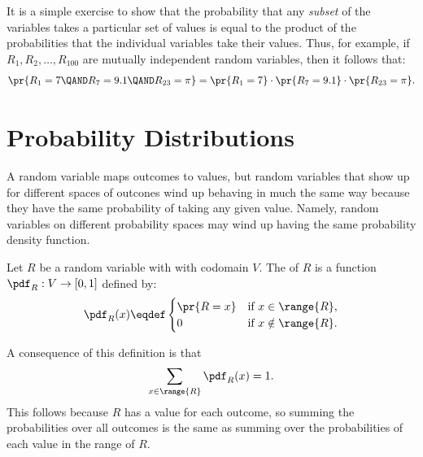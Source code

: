 It is a simple exercise to show that the probability that any
\emph{subset} of the variables takes a particular set of values is equal
to the product of the probabilities that the individual variables take
their values.  Thus, for example, if $R_1, R_2, \dots, R_{100}$ are
mutually independent random variables, then it follows that:
\[
\pr{R_1 = 7 \QAND R_7 = 9.1 \QAND R_{23} = \pi} = \pr{R_1 = 7} \cdot
\pr{R_7 = 9.1} \cdot \pr{R_{23} = \pi}.
\]



\section{Probability Distributions}

A random variable maps outcomes to values, but random variables that show
up for different spaces of outcones wind up behaving in much the same way
because they have the same probability of taking any given value.  Namely,
random variables on different probability spaces may wind up having the
same probability density function.

\begin{definition}
Let $R$ be a random variable with with codomain $V$.
The  of $R$
is a function $\pdf_R : V \to [0,1]$ defined by:
%
\[
\pdf_R(x) \eqdef \begin{cases}
            \pr{R = x} & \text{if } x \in \range{R},\\
             0 & \text{if } x \notin \range{R}.
           \end{cases}
\]
\end{definition}
%
A consequence of this definition is that
%
\[
\sum_{x \in \range{R}} \pdf_R(x) = 1.
\]
This follows because $R$ has a value for each outcome, so summing the
probabilities over all outcomes is the same as summing over the
probabilities of each value in the range of $R$.

